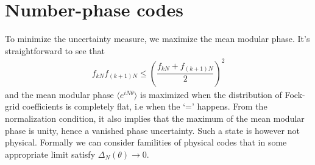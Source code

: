 \documentclass{article}
\begin{document}
\section{Number-phase codes}
To minimize the uncertainty measure, we maximize the mean modular phase. It's straightforward to see that 
\begin{align}
    f_{kN}f_{(k+1)N} \leq \left(\dfrac{f_{kN}+f_{(k+1)N}}{2}\right)^2
\end{align}
and the mean modular phase $\langle e^{iN\theta}\rangle$ is maximized when the distribution of Fock-grid coefficients is completely flat, i.e when the `=' happens. From the normalization condition, it also implies that the maximum of the mean modular phase is unity, hence a vanished phase uncertainty. Such a state is however not physical. Formally we can consider familities of physical codes that in some appropriate limit satisfy $\Delta_N(\theta)\to 0$. 
\end{document}
